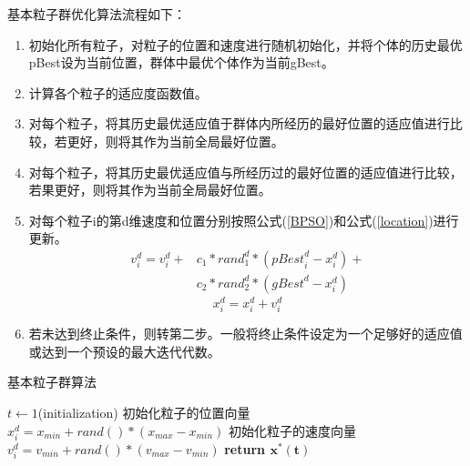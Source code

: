 基本粒子群优化算法流程如下：
\begin{enumerate}
	\item 初始化所有粒子，对粒子的位置和速度进行随机初始化，并将个体的历史最优pBest设为当前位置，群体中最优个体作为当前gBest。
	\item 计算各个粒子的适应度函数值。
	\item 对每个粒子，将其历史最优适应值于群体内所经历的最好位置的适应值进行比较，若更好，则将其作为当前全局最好位置。
	\item 对每个粒子，将其历史最优适应值与所经历过的最好位置的适应值进行比较，若果更好，则将其作为当前全局最好位置。
	\item 对每个粒子i的第d维速度和位置分别按照公式(\ref{BPSO})和公式(\ref{location})进行更新。
	\begin{equation}
	\begin{split}
	\label{BPSO}
	v_i^d=v_i^d+&c_1*{rand}_1^d*({pBest}_i^d-x_i^d )+\\
	&c_2*{rand}_2^d*({gBest}^d-x_i^d)
	\end{split}
	\end{equation}
	\begin{equation}
	\label{location}
	x_i^d=x_i^d+v_i^d
	\end{equation}
	
	\item 若未达到终止条件，则转第二步。一般将终止条件设定为一个足够好的适应值或达到一个预设的最大迭代代数。






\end{enumerate}

\renewcommand{\algorithmcfname}{算法}%
\begin{algorithm}[H]
	\caption{基本粒子群算法}
	$t\gets 1$(initialization)\;
	初始化粒子的位置向量\qquad$x_i^d=x_{min}+rand()*(x_{max}-x_{min})$\;
	初始化粒子的速度向量\qquad$v_i^d=v_{min}+rand()*(v_{max}-v_{min})$\;
	\textbf{return $\bm{x^*(t)}$}\;
\end{algorithm}

